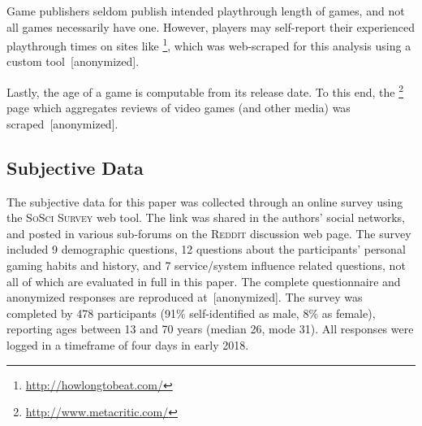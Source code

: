 Game publishers seldom publish intended playthrough
length of games, and not all games necessarily have one. However, players
may self-report their experienced playthrough times on sites like
\hltb\footnote{\url{http://howlongtobeat.com/}}, which was web-scraped
for this analysis using a custom tool~[anonymized].


Lastly, the age of a game is computable from its release date. To this end, the
\metacritic\footnote{\url{http://www.metacritic.com/}} page which
aggregates reviews of video games (and other media) was
scraped~[anonymized].



\subsection{Subjective Data}

The subjective data for this paper was collected through an online
survey using the \textsc{SoSci Survey} web tool. The link was shared
in the authors' social networks, and posted in various sub-forums on
the \textsc{Reddit} discussion web page.
The survey included 9 demographic questions, 12 questions about the
participants' personal gaming habits and history, and 7 service/system
influence related questions, not all of which are evaluated in full
in this paper. The complete questionnaire and anonymized responses
are reproduced at~[anonymized].
The survey was completed by
478 participants (91\% self-identified as male, 8\% as female), reporting
ages between 13 and 70 years (median 26, mode 31).
All responses were logged in a timeframe of four days in early 2018.

